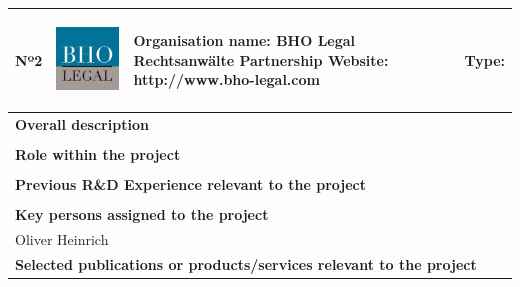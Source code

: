 \begin{longtable}[H]{|p{0.7cm}|p{4cm}|p{7cm}|p{1.3cm}|}
	\hline
	\begin{center} Nº2 \end{center} & \begin{center} \includegraphics[scale=0.4]{./logos/BHO-logo} \end{center} & \begin{center} \textbf{Organisation name:} BHO Legal Rechtsanwälte Partnership \newline \textbf{Website:} http://www.bho-legal.com \end{center} & \begin{center} Type: \end{center} \\ \hline
	
	\multicolumn{4}{|p{13cm}|}{\textbf{Overall description}}  \\ \hline
	
	\multicolumn{4}{|p{13cm}|}{}  \\ \hline
	
	\multicolumn{4}{|p{13cm}|}{\textbf{Role within the project}}   \\ \hline
	
	\multicolumn{4}{|p{13cm}|}{}  \\ \hline
	
	\multicolumn{4}{|p{13cm}|}{\textbf{Previous R\&D Experience relevant to the project}}  \\ \hline
	
	\multicolumn{4}{|p{13cm}|}{}  \\ \hline
	
	\multicolumn{4}{|p{13cm}|}{\textbf{Key persons assigned to the project}}   \\ \hline
	
	\multicolumn{4}{|p{13cm}|}{Oliver Heinrich}  \\ \hline
	
	\multicolumn{4}{|p{13cm}|}{\textbf{Selected publications or products/services relevant to the project}}  \\ \hline
	

\end{longtable}
